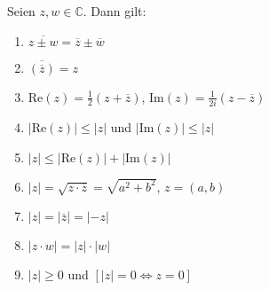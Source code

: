Seien $z, w \in \mathbb{C}$. Dann gilt: 
\begin{enumerate}
    \item $\overline{z \pm w} = \overline{z} \pm \overline{w}$
    \item $\overline{(\overline{z})} = z$
    \item $\text{Re}(z) = \frac{1}{2}(z+\overline{z})$,
    $\text{Im}(z) = \frac{1}{2i}(z-\overline{z})$
    \item $|\text{Re}(z)| \leq |z|$ und
    $|\text{Im}(z)| \leq |z|$
    \item $|z| \leq |\text{Re}(z)| + |\text{Im}(z)|$
    \item $|z| = \sqrt{z \cdot \overline{z}} = \sqrt{a^2+b^2}$,
    $z = (a, b)$
    \item $|z| = |\overline{z}| = |-z|$
    \item $|z \cdot w| = |z| \cdot |w|$
    \item $|z| \geq 0$ und $[|z| = 0 \Leftrightarrow z = 0]$
\end{enumerate}